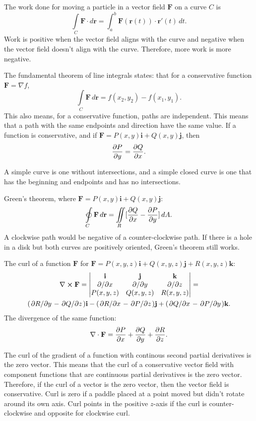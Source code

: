 \documentclass{article}
\begin{document}
The work done for moving a particle in a vector field $\mathbf{F}$ on a curve $C$ is
\[
\int \limits_C \mathbf{F} \cdot d\mathbf{r} = 
\int_a^b \mathbf{F}(\mathbf{r}(t)) \cdot \mathbf{r}'(t) \, dt.
\]
Work is positive when the vector field aligns with the curve and negative when
the vector field doesn't align with the curve. Therefore, more work is more negative. 

The fundamental theorem of line integrals states: 
that for a conservative function $\mathbf{F} = \nabla f$,
\[
\int \limits_C \mathbf{F} \, d\mathbf{r} = f(x_2, y_2) - f(x_1, y_1).
\]
This also means, for a conservative function, paths are independent.
This means that a path with the same endpoints and direction
have the same value. If a function is conservative,
and if $\mathbf{F} = P(x,y)\mathbf{i} + Q(x,y)\mathbf{j}$, then
\[
\pdv{P}{y} = \pdv{Q}{x}.
\]

A simple curve is one without intersections,
and a simple closed curve is one that has the beginning and endpoints
and has no intersections.

Green's theorem, where $\mathbf{F} = P(x,y)\mathbf{i} + Q(x,y)\mathbf{j}$:
\[
\varointctrclockwise \limits_C \mathbf{F} \, d\mathbf{r} =
\iint \limits_R [\pdv{Q}{x} - \pdv{P}{y}] \, dA.
\]
A clockwise path would be negative of a counter-clockwise path.
If there is a hole in a disk but both curves are positively oriented,
Green's theorem still works.

The curl of a function $\mathbf{F}$ for 
$\mathbf{F} = P(x,y,z)\mathbf{i} + Q(x,y,z)\mathbf{j} + R(x,y,z)\mathbf{k}$:
\begin{gather}
    \nabla \cross \mathbf{F} = 
    \begin{vmatrix}
        \mathbf{i} & \mathbf{j} & \mathbf{k} \\ 
        \pdv*{}{x} & \pdv*{}{y} & \pdv*{}{z} \\ 
        P(x,y,z) & Q(x,y,z) & R(x,y,z)
    \end{vmatrix} = \nonumber \\
    (\pdv*{R}{y} - \pdv*{Q}{z})\mathbf{i} -
    (\pdv*{R}{x} - \pdv*{P}{z})\mathbf{j} + 
    (\pdv*{Q}{x} - \pdv*{P}{y})\mathbf{k} \nonumber.
\end{gather}
The divergence of the same function: 
\[
\nabla \cdot \mathbf{F} = \pdv{P}{x} + \pdv{Q}{y} + \pdv{R}{z}.
\]

The curl of the gradient of a function with continous second partial derivatives
is the zero vector. This means that the curl of a conservative vector field 
with component functions that are continuous partial derivatives is the zero vector. 
Therefore, if the curl of a vector is the zero vector, then the vector field is conservative.
Curl is zero if a paddle placed at a point moved but didn't rotate around its own axis. 
Curl points in the positive $z$-axis if the curl is counter-clockwise and opposite for clockwise curl.
\end{document}
